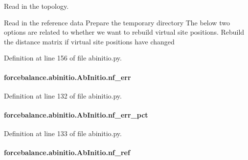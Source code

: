 Read in the topology. 

Read in the reference data Prepare the temporary directory The below two options are related to whether we want to rebuild virtual site positions. Rebuild the distance matrix if virtual site positions have changed 

Definition at line 156 of file abinitio.\-py.

\hypertarget{classforcebalance_1_1abinitio_1_1AbInitio_a89de620e9aa500481c9e1ded99e14f72}{
\paragraph[{nf\-\_\-err}]{\setlength{\rightskip}{0pt plus 5cm}forcebalance.\-abinitio.\-Ab\-Initio.\-nf\-\_\-err\hspace{0.3cm}{\ttfamily [inherited]}}}\label{classforcebalance_1_1abinitio_1_1AbInitio_a89de620e9aa500481c9e1ded99e14f72}


Definition at line 132 of file abinitio.\-py.

\hypertarget{classforcebalance_1_1abinitio_1_1AbInitio_a184edac2cb27a999c363595ea59d8163}{
\paragraph[{nf\-\_\-err\-\_\-pct}]{\setlength{\rightskip}{0pt plus 5cm}forcebalance.\-abinitio.\-Ab\-Initio.\-nf\-\_\-err\-\_\-pct\hspace{0.3cm}{\ttfamily [inherited]}}}\label{classforcebalance_1_1abinitio_1_1AbInitio_a184edac2cb27a999c363595ea59d8163}


Definition at line 133 of file abinitio.\-py.

\hypertarget{classforcebalance_1_1abinitio_1_1AbInitio_a5a77f4b99a5b01245ab0435d632122a1}{
\paragraph[{nf\-\_\-ref}]{\setlength{\rightskip}{0pt plus 5cm}forcebalance.\-abinitio.\-Ab\-Initio.\-nf\-\_\-ref\hspace{0.3cm}{\ttfamily [inherited]}}}\label{classforcebalance_1_1abinitio_1_1AbInitio_a5a77f4b99a5b01245ab0435d632122a1}


